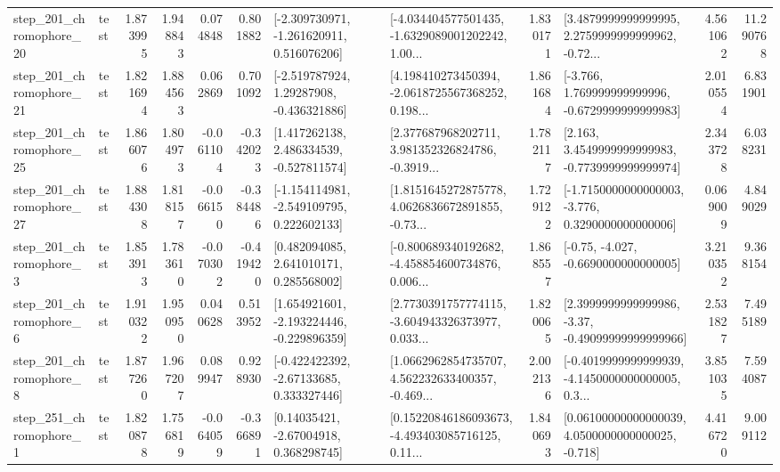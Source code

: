 \begin{tabular}{llrrrrllrlrr}
  step\_201\_chromophore\_20 &      test &      1.873995 &    1.948843 &      0.074848 &  0.801882 &   [-2.309730971, -1.261620911, 0.516076206] &  [-4.034404577501435, -1.6329089001202242, 1.00... &       1.830171 &  [3.4879999999999995, 2.2759999999999962, -0.72... &            4.561062 &         11.290768 \\
  step\_201\_chromophore\_21 &      test &      1.821694 &    1.884563 &      0.062869 &  0.701092 &    [-2.519787924, 1.29287908, -0.436321886] &  [4.198410273450394, -2.0618725567368252, 0.198... &       1.861684 &   [-3.766, 1.769999999999996, -0.6729999999999983] &            2.010554 &          6.831901 \\
  step\_201\_chromophore\_25 &      test &      1.866076 &    1.804973 &     -0.061104 & -0.342023 &    [1.417262138, 2.486334539, -0.527811574] &  [2.377687968202711, 3.981352326824786, -0.3919... &       1.782117 &   [2.163, 3.4549999999999983, -0.7739999999999974] &            2.343728 &          6.038231 \\
  step\_201\_chromophore\_27 &      test &      1.884308 &    1.818157 &     -0.066150 & -0.384486 &   [-1.154114981, -2.549109795, 0.222602133] &  [1.8151645272875778, 4.0626836672891855, -0.73... &       1.729122 &  [-1.7150000000000003, -3.776, 0.3290000000000006] &            0.069009 &          4.849029 \\
   step\_201\_chromophore\_3 &      test &      1.853913 &    1.783610 &     -0.070302 & -0.419420 &     [0.482094085, 2.641010171, 0.285568002] &  [-0.800689340192682, -4.458854600734876, 0.006... &       1.868557 &               [-0.75, -4.027, -0.6690000000000005] &            3.210352 &          9.368154 \\
   step\_201\_chromophore\_6 &      test &      1.910322 &    1.950950 &      0.040628 &  0.513952 &   [1.654921601, -2.193224446, -0.229896359] &  [2.7730391757774115, -3.604943326373977, 0.033... &       1.820065 &  [2.3999999999999986, -3.37, -0.49099999999999966] &            2.531827 &          7.495189 \\
   step\_201\_chromophore\_8 &      test &      1.877260 &    1.967207 &      0.089947 &  0.928930 &    [-0.422422392, -2.67133685, 0.333327446] &  [1.0662962854735707, 4.562232633400357, -0.469... &       2.002136 &  [-0.4019999999999939, -4.1450000000000005, 0.3... &            3.851035 &          7.594087 \\
   step\_251\_chromophore\_1 &      test &      1.820878 &    1.756819 &     -0.064059 & -0.366891 &      [0.14035421, -2.67004918, 0.368298745] &  [0.15220846186093673, -4.493403085716125, 0.11... &       1.840693 &  [0.06100000000000039, 4.0500000000000025, -0.718] &            4.416720 &          9.009112 \\

\end{tabular}
